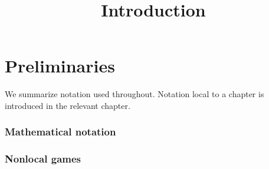 

%



\part{Preliminaries}
\label{book-part-preliminaries}

\title{Introduction}
\label{introduction}


\maketitle


\tableofcontents

We summarize notation used throughout. Notation local to a chapter is introduced in the relevant chapter. 


\section{Mathematical notation}
\label{section-mathnotation}


\section{Nonlocal games}
\label{section-gamesnotation}










